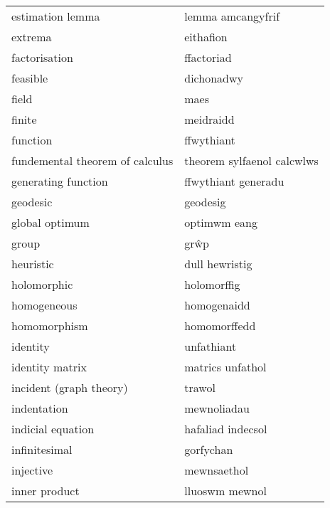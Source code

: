 \begin{supertabular}{p{0.22\textwidth}p{0.22\textwidth}}
                 estimation lemma &                lemma amcangyfrif \\
                          extrema &                        eithafion \\
                    factorisation &                       ffactoriad \\
                         feasible &                       dichonadwy \\
                            field &                             maes \\
                           finite &                        meidraidd \\
                         function &                       ffwythiant \\
  fundemental theorem of calculus &       theorem sylfaenol calcwlws \\
              generating function &              ffwythiant generadu \\
                         geodesic &                         geodesig \\
                   global optimum &                     optimwm eang \\
                            group &                             grŵp \\
                        heuristic &                   dull hewristig \\
                      holomorphic &                      holomorffig \\
                      homogeneous &                      homogenaidd \\
                     homomorphism &                     homomorffedd \\
                         identity &                       unfathiant \\
                  identity matrix &                 matrics unfathol \\
          incident (graph theory) &                           trawol \\
                      indentation &                      mewnoliadau \\
                indicial equation &                hafaliad indecsol \\
                    infinitesimal &                        gorfychan \\
                        injective &                      mewnsaethol \\
                    inner product &                   lluoswm mewnol \\

\end{supertabular}
